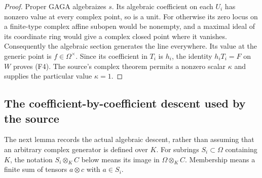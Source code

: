 \begin{proof}
Proper GAGA algebraizes \(s\).
Its algebraic coefficient on each \(U_i\) has nonzero value at
every complex point, so is a unit.
For otherwise its zero locus on a finite-type complex affine
subopen would be nonempty, and a maximal ideal of its coordinate
ring would give a complex closed point where it vanishes.
Consequently the algebraic section generates the line everywhere.
Its value at the generic point is \(f\in\Omega^\times\).
Since its coefficient in \(T_i\) is \(h_i\), the identity
\(h_iT_i=F\) on \(W\) proves (F4).
The source's complex theorem permits a nonzero scalar \(\kappa\)
and supplies the particular value \(\kappa=1\).
\end{proof}

\subsection{The coefficient-by-coefficient descent used by the source}

The next lemma records the actual algebraic descent, rather than
assuming that an arbitrary complex generator is defined over \(K\).
For subrings \(S_i\subset\Omega\) containing \(K\), the notation
\(S_i\otimes_K C\) below means its image in
\(\Omega\otimes_K C\).  Membership means a finite sum of tensors
\(a\otimes c\) with \(a\in S_i\).

